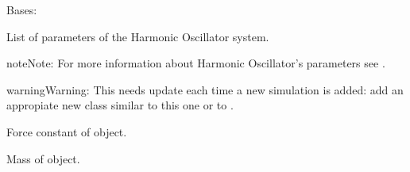 \documentclass[a4paper,landscape,10pt,english]{sphinxmanual}
\begin{document}

\begin{fulllineitems}
\label{\detokenize{code_docs/simulation_api.controller:simulation_api.controller.schemas.HOParams}}
Bases: 

List of parameters of the Harmonic Oscillator system.

\begin{sphinxadmonition}{note}{Note:}
For more information about Harmonic Oscillator’s parameters see
{\hyperref[\detokenize{code_docs/simulation_api.simulation:simulation_api.simulation.simulations.HarmonicOsc1D}]{}}.
\end{sphinxadmonition}

\begin{sphinxadmonition}{warning}{Warning:}
This needs update each time a new simulation is added: add an
appropiate new class similar to this one or to
{\hyperref[\detokenize{code_docs/simulation_api.controller:simulation_api.controller.schemas.ChenLeeParams}]{}}.
\end{sphinxadmonition}

\begin{fulllineitems}
\label{\detokenize{code_docs/simulation_api.controller:simulation_api.controller.schemas.HOParams.k}}
Force constant of object.

\end{fulllineitems}


\begin{fulllineitems}
\label{\detokenize{code_docs/simulation_api.controller:simulation_api.controller.schemas.HOParams.m}}
Mass of object.

\end{fulllineitems}


\end{fulllineitems}
\end{document}
